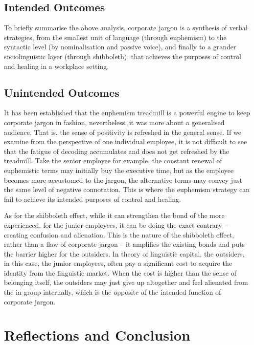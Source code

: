 \documentclass[a4paper,12pt]{article}
\begin{document}
\subsection{Intended Outcomes}

To briefly summarise the above analysis, corporate jargon is a synthesis of verbal strategies, from the smallest unit of language (through euphemism) to the syntactic level (by nominalisation and passive voice), and finally to a grander sociolinguistic layer (through shibboleth), that achieves the purposes of control and healing in a workplace setting.

\subsection{Unintended Outcomes}

It has been established that the euphemism treadmill is a powerful engine to keep corporate jargon in fashion, nevertheless, it was more about a generalised audience.
That is, the sense of positivity is refreshed in the general sense.
If we examine from the perspective of one individual employee, it is not difficult to see that the fatigue of decoding accumulates and does not get refreshed by the treadmill.
Take the senior employee for example, the constant renewal of euphemistic terms may initially buy the executive time, but as the employee becomes more accustomed to the jargon, the alternative terms may convey just the same level of negative connotation.
This is where the euphemism strategy can fail to achieve its intended purposes of control and healing.

As for the shibboleth effect, while it can strengthen the bond of the more experienced, for the junior employees, it can be doing the exact contrary -- creating confusion and alienation.
This is the nature of the shibboleth effect, rather than a flaw of corporate jargon -- it amplifies the existing bonds and puts the barrier higher for the outsiders.
In  theory of linguistic capital, the outsiders, in this case, the junior employees, often pay a significant cost to acquire the identity from the linguistic market.
When the cost is higher than the sense of belonging itself, the outsiders may just give up altogether and feel alienated from the in-group internally, which is the opposite of the intended function of corporate jargon.

\section{Reflections and Conclusion}
\end{document}
